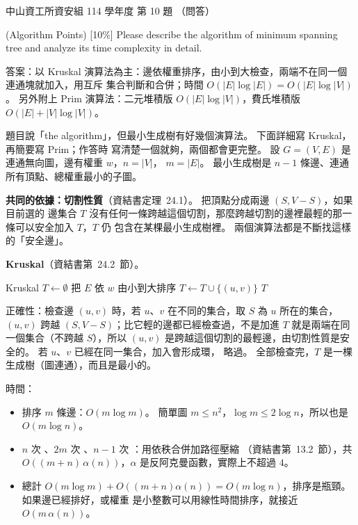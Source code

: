 \begin{pastexam}[label={px:nsysu-114-dmalg-09}]{中山資工所資安組 114 學年度 第 10 題}
（問答）

(Algorithm Points) {[10\%]} Please describe the algorithm of minimum spanning tree and analyze its
time complexity in detail.
\end{pastexam}

\begin{pastsoln}
答案：以 Kruskal 演算法為主：邊依權重排序，由小到大檢查，兩端不在同一個連通塊就加入，用互斥
集合判斷和合併；時間 $O(|E| \log |E|) = O(|E| \log |V|)$。 另外附上 Prim 演算法：二元堆積版
$O(|E| \log |V|)$，費氏堆積版 $O(|E| + |V| \log |V|)$。

題目說「the algorithm」，但最小生成樹有好幾個演算法。 下面詳細寫 Kruskal，再簡要寫 Prim；作答時
寫清楚一個就夠，兩個都會更完整。 設 $G = (V, E)$ 是連通無向圖，邊有權重 $w$，$n = |V|$，
$m = |E|$。 最小生成樹是 $n - 1$ 條邊、連通所有頂點、總權重最小的子圖。

\textbf{共同的依據：切割性質}（資結書定理~24.1）。 把頂點分成兩邊 $(S, V - S)$，如果目前選的
邊集合 $T$ 沒有任何一條跨越這個切割，那麼跨越切割的邊裡最輕的那一條可以安全加入 $T$，$T$ 仍
包含在某棵最小生成樹裡。 兩個演算法都是不斷找這樣的「安全邊」。

\textbf{Kruskal}（資結書第~24.2~節）。
\begin{pseudo}{Kruskal}
    \State $T \gets \emptyset$
        \State {}
    \EndFor
    \State 把 $E$ 依 $w$ 由小到大排序
         
            \State $T \gets T \cup \{(u, v)\}$
            \State {}
        \EndIf
    \EndFor
    \State \Return $T$
\EndFunction
\end{pseudo}
正確性：檢查邊 $(u, v)$ 時，若 $u$、$v$ 在不同的集合，取 $S$ 為 $u$ 所在的集合，$(u, v)$ 跨越
$(S, V - S)$；比它輕的邊都已經檢查過，不是加進 $T$ 就是兩端在同一個集合（不跨越 $S$），所以
$(u, v)$ 是跨越這個切割的最輕邊，由切割性質是安全的。 若 $u$、$v$ 已經在同一集合，加入會形成環，
略過。 全部檢查完，$T$ 是一棵生成樹（圖連通），而且是最小的。

時間：
\begin{itemize}
\item 排序 $m$ 條邊：$O(m \log m)$。 簡單圖 $m \le n^2$，$\log m \le 2 \log n$，所以也是
$O(m \log n)$。
\item $n$ 次 、$2m$ 次 、$n - 1$ 次 ：用依秩合併加路徑壓縮
（資結書第~13.2~節），共 $O((m + n)\,\alpha(n))$，$\alpha$ 是反阿克曼函數，實際上不超過 $4$。
\item 總計 $O(m \log m) + O((m + n)\alpha(n)) = O(m \log n)$，排序是瓶頸。 如果邊已經排好，或權重
是小整數可以用線性時間排序，就接近 $O(m\, \alpha(n))$。
\end{itemize}


\end{pastsoln}
